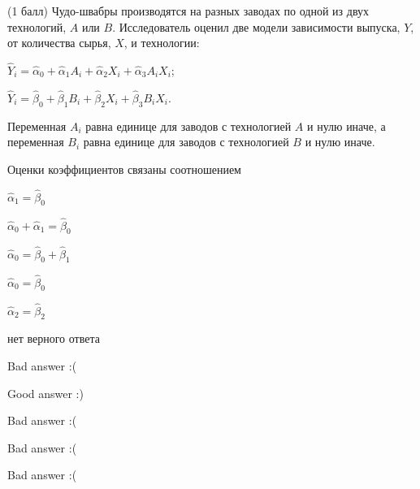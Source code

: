 
\begin{question}
(1 балл) Чудо-швабры производятся на разных заводах по одной из двух технологий,
\(A\) или \(B\). Исследователь оценил две модели зависимости выпуска,
\(Y\), от количества сырья, \(X\), и технологии:

\(\hat Y_i = \hat \alpha_0 + \hat\alpha_1 A_i + \hat\alpha_2 X_i + \hat\alpha_3 A_i X_i\);

\(\hat Y_i = \hat \beta_0 + \hat\beta_1 B_i + \hat\beta_2 X_i + \hat\beta_3 B_i X_i\).

Переменная \(A_i\) равна единице для заводов с технологией \(A\) и нулю
иначе, а переменная \(B_i\) равна единице для заводов с технологией
\(B\) и нулю иначе.

Оценки коэффициентов связаны соотношением
\begin{answerlist}
  \item \(\hat\alpha_1 = \hat\beta_0\)
  \item \(\hat\alpha_0 + \hat\alpha_1 = \hat\beta_0\)
  \item \(\hat\alpha_0 = \hat\beta_0 + \hat\beta_1\)
  \item \(\hat\alpha_0 = \hat\beta_0\)
  \item \(\hat\alpha_2 = \hat\beta_2\)
  \item нет верного ответа
\end{answerlist}
\end{question}

\begin{solution}
\begin{answerlist}
  \item Bad answer :(
  \item Good answer :)
  \item Bad answer :(
  \item Bad answer :(
  \item Bad answer :(
\end{answerlist}
\end{solution}
